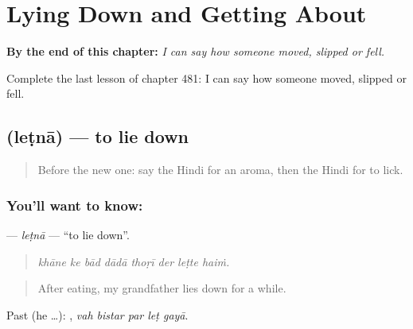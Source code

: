 
\chapter{Lying Down and Getting About}
\label{ch:hi-lying-down-and-getting-about}

\begin{chapteropening}
\textbf{By the end of this chapter:} \emph{I can say how someone moved, slipped or fell.}

Complete the last lesson of chapter 481: I can say how someone moved, slipped or fell.
\end{chapteropening}

\section[\texorpdfstring{\hi{लेटना} (leṭnā)}{लेटना (leṭnā)}]{ (leṭnā) — to lie down}

\label{lesson:HI-C481-letna}



\begin{quote}
Before the new one: say the Hindi for an aroma, then the Hindi for to lick.
\end{quote}

\subsection*{You'll want to know: }
\textbf{} — \emph{leṭnā} — \textquotedblleft{}to lie down\textquotedblright{}.

\begin{quote}
       
\end{quote}

\begin{quote}
\emph{khāne ke bād dādā thoṛī der leṭte haiṁ.}
\end{quote}

\begin{quote}
After eating, my grandfather lies down for a while.
\end{quote}

Past (he …):     , \emph{vah bistar par leṭ gayā}.

